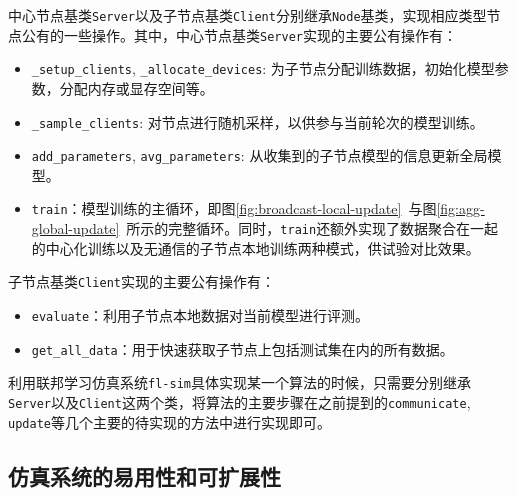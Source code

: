 中心节点基类\texttt{Server}以及子节点基类\texttt{Client}分别继承\texttt{Node}基类，实现相应类型节点公有的一些操作。其中，中心节点基类\texttt{Server}实现的主要公有操作有：
\begin{itemize}
    \item \texttt{\_setup\_clients}, \texttt{\_allocate\_devices}: 为子节点分配训练数据，初始化模型参数，分配内存或显存空间等。
    \item \texttt{\_sample\_clients}: 对节点进行随机采样，以供参与当前轮次的模型训练。
    \item \texttt{add\_parameters}, \texttt{avg\_parameters}: 从收集到的子节点模型的信息更新全局模型。
    \item \texttt{train}：模型训练的主循环，即图\ref{fig:broadcast-local-update}~与图\ref{fig:agg-global-update}~所示的完整循环。同时，\texttt{train}还额外实现了数据聚合在一起的中心化训练以及无通信的子节点本地训练两种模式，供试验对比效果。
\end{itemize}
子节点基类\texttt{Client}实现的主要公有操作有：
\begin{itemize}
    \item \texttt{evaluate}：利用子节点本地数据对当前模型进行评测。
    \item \texttt{get\_all\_data}：用于快速获取子节点上包括测试集在内的所有数据。
\end{itemize}
利用联邦学习仿真系统\texttt{fl-sim}具体实现某一个算法的时候，只需要分别继承\texttt{Server}以及\texttt{Client}这两个类，将算法的主要步骤在之前提到的\texttt{communicate}, \texttt{update}等几个主要的待实现的方法中进行实现即可。

\subsection{仿真系统的易用性和可扩展性}

